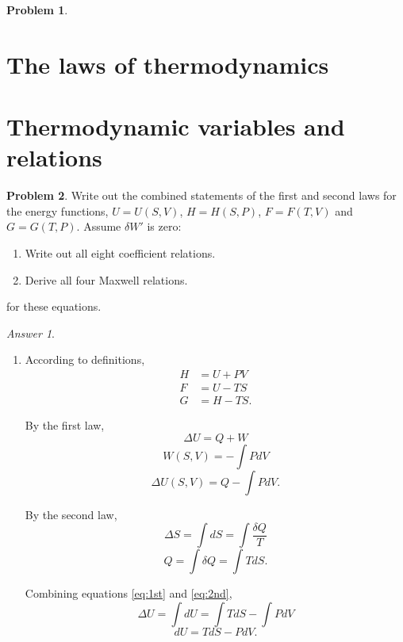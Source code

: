 \documentclass[a4paper, 12pt]{article}
\theoremstyle{definition}
\newtheorem{problem}{Problem}[section]
\theoremstyle{remark}
\newtheorem*{answer}{Answer}
\begin{document}
\begin{problem}
\end{problem}

\section{The laws of thermodynamics}

\section{Thermodynamic variables and relations}
\begin{problem}
    Write out the combined statements of the first and second laws for the
    energy functions, $U = U(S, V)$, $H = H(S, P)$, $F = F(T, V)$ and $G = G(T,
    P)$.  Assume $\delta W'$ is zero:
    \begin{enumerate}
        \item Write out all eight coefficient relations.
        \item Derive all four Maxwell relations.
    \end{enumerate}
    for these equations.

    \begin{answer}
        \begin{enumerate}
            \item According to definitions,
                \begin{align*}
                    H &= U + PV \\
                    F &= U - TS \\
                    G &= H - TS.
                \end{align*}

                By the first law,
                \[ \Delta U = Q + W \]
                \[ W(S, V) = -\int PdV \]
                \begin{equation}
                    \Delta U(S, V) = Q -\int PdV. \label{eq:1st}
                \end{equation}

                By the second law,
                \[ \Delta S = \int dS = \int \frac{\delta Q}{T} \]
                \begin{equation}
                    Q = \int \delta Q = \int TdS. \label{eq:2nd}
                \end{equation}

                Combining equations \eqref{eq:1st} and \eqref{eq:2nd},
                \[ \Delta U = \int dU = \int TdS - \int PdV \]
                \begin{equation}
                    dU = TdS - PdV. \label{eq:dU}
                \end{equation}


\end{enumerate}
\end{answer}
\end{problem}
\end{document}
